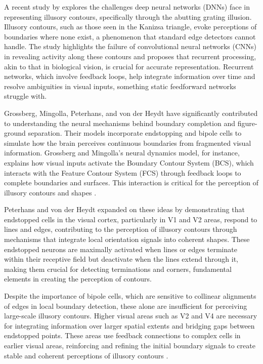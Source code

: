 \documentclass[12pt]{article}
\begin{document}
A recent study by \textcite{fanChallengingDeepLearning2023} explores the challenges deep neural networks (DNNs) face in representing illusory contours, specifically through the abutting grating illusion. Illusory contours, such as those seen in the Kanizsa triangle, evoke perceptions of boundaries where none exist, a phenomenon that standard edge detectors cannot handle. The study highlights the failure of convolutional neural networks (CNNs) in revealing activity along these contours and proposes that recurrent processing, akin to that in biological vision, is crucial for accurate representation. Recurrent networks, which involve feedback loops, help integrate information over time and resolve ambiguities in visual inputs, something static feedforward networks struggle with.

Grossberg, Mingolla, Peterhans, and von der Heydt have significantly contributed to understanding the neural mechanisms behind boundary completion and figure-ground separation. Their models incorporate endstopping and bipole cells to simulate how the brain perceives continuous boundaries from fragmented visual information. Grossberg and Mingolla's neural dynamics model, for instance, explains how visual inputs activate the Boundary Contour System (BCS), which interacts with the Feature Contour System (FCS) through feedback loops to complete boundaries and surfaces. This interaction is critical for the perception of illusory contours and shapes \autocite{grossbergTextureSegregationSurface1998}.

Peterhans and von der Heydt expanded on these ideas by demonstrating that endstopped cells in the visual cortex, particularly in V1 and V2 areas, respond to lines and edges, contributing to the perception of illusory contours through mechanisms that integrate local orientation signals into coherent shapes\autocite{grossbergTextureSegregationSurface1998}. These endstopped neurons are maximally activated when lines or edges terminate within their receptive field but deactivate when the lines extend through it, making them crucial for detecting terminations and corners, fundamental elements in creating the perception of contours.

Despite the importance of bipole cells, which are sensitive to collinear alignments of edges in local boundary detection, these alone are insufficient for perceiving large-scale illusory contours. Higher visual areas such as V2 and V4 are necessary for integrating information over larger spatial extents and bridging gaps between endstopped points. These areas use feedback connections to complex cells in earlier visual areas, reinforcing and refining the initial boundary signals to create stable and coherent perceptions of illusory contours \autocite{grossbergTextureSegregationSurface1998}.
\end{document}
